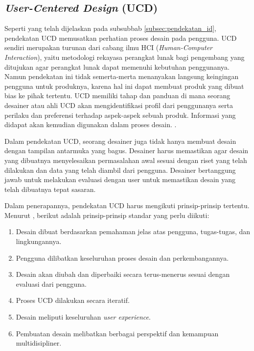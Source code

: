 \subsection{\textit{User-Centered Design} (UCD)}
Seperti yang telah dijelaskan pada subsubbab \ref{subsec:pendekatan_id}, pendekatan UCD memusatkan perhatian proses desain pada pengguna. UCD sendiri merupakan turunan dari cabang ilmu HCI (\textit{Human-Computer Interaction}), yaitu metodologi rekayasa perangkat lunak bagi pengembang yang ditujukan agar perangkat lunak dapat memenuhi kebutuhan penggunanya. \parencite{lowdermilk2013user} Namun pendekatan ini tidak semerta-merta menanyakan langsung keingingan pengguna untuk produknya, karena hal ini dapat membuat produk yang dibuat bias ke pihak tertentu. UCD memiliki tahap dan panduan di mana seorang desainer atau ahli UCD akan mengidentifikasi profil dari penggunanya serta perilaku dan preferensi terhadap aspek-aspek sebuah produk. Informasi yang didapat akan kemudian digunakan dalam proses desain. \parencite{10.1145/1621995.1621997}.

Dalam pendekatan UCD, seorang desainer juga tidak hanya membuat desain dengan tampilan antarmuka yang bagus. Desainer harus memastikan agar desain yang dibuatnya menyelesaikan permasalahan awal sesuai dengan riset yang telah dilakukan dan data yang telah diambil dari pengguna. Desainer bertanggung jawab untuk melakukan evaluasi dengan user untuk memastikan desain yang telah dibuatnya tepat sasaran. \parencite{lowdermilk2013user}

Dalam penerapannya, pendekatan UCD harus mengikuti prinsip-prinsip tertentu. Menurut \textcite{iso9241-210:2010}, berikut adalah prinsip-prinsip standar yang perlu diikuti:

\begin{enumerate}
  \item Desain dibuat berdasarkan pemahaman jelas atas pengguna, tugas-tugas, dan lingkungannya.
  \item Pengguna dilibatkan keseluruhan proses desain dan perkembangannya.
  \item Desain akan diubah dan diperbaiki secara terus-menerus sesuai dengan evaluasi dari pengguna.
  \item Proses UCD dilakukan secara iteratif.
  \item Desain meliputi keseluruhan \textit{user experience}.
  \item Pembuatan desain melibatkan berbagai perspektif dan kemampuan multidisipliner.
\end{enumerate}

